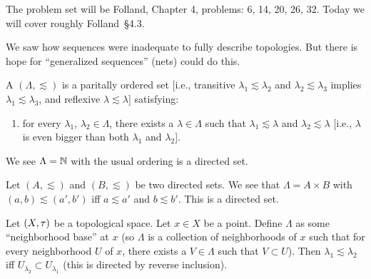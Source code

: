 
\lecture{}

\begin{node}
The problem set will be Folland, Chapter 4, problems: 6, 14, 20, 26, 32.
Today we will cover roughly Folland~\S4.3.
\end{node}

\begin{recall}
We saw how sequences were inadequate to fully describe topologies. But
there is hope for ``generalized sequences'' (nets) could do this.
\end{recall}

\begin{definition}
A  $(\Lambda,\lesssim)$ is a paritally ordered
set [i.e., transitive $\lambda_{1}\lesssim\lambda_{2}$ and
  $\lambda_{2}\lesssim\lambda_{3}$ implies $\lambda_{1}\lesssim\lambda_{3}$,
  and reflexive $\lambda\lesssim\lambda$] satisfying:
\begin{enumerate}
\item for every $\lambda_{1}$, $\lambda_{2}\in\Lambda$, there exists a
  $\lambda\in\Lambda$ such that $\lambda_{1}\lesssim\lambda$ and
  $\lambda_{2}\lesssim\lambda$ [i.e., $\lambda$ is even bigger than
  both $\lambda_{1}$ and $\lambda_{2}$]. 
\end{enumerate}
\end{definition}

\begin{example}
We see $\Lambda=\mathbb{N}$ with the usual ordering is a directed set.
\end{example}

\begin{example}
Let $(A,\lesssim)$ and $(B,\lesssim)$ be two directed sets.
We see that $\Lambda=A\times B$ with $(a,b)\lesssim(a',b')$ iff
$a\lesssim a'$ and $b\lesssim b'$. This is a directed set.
\end{example}

\begin{example}
Let $(X,\tau)$ be a topological space. Let $x\in X$ be a point.
Define $\Lambda$ as some ``neighborhood base'' at $x$ (so $\Lambda$ is
a collection of neighborhoods of $x$ such that for every neighborhood
$U$ of $x$, there exists a $V\in\Lambda$ such that $V\subset U$). Then
$\lambda_{1}\lesssim\lambda_{2}$ iff $U_{\lambda_{2}}\subset U_{\lambda_{1}}$
(this is directed by reverse inclusion).
\end{example}

